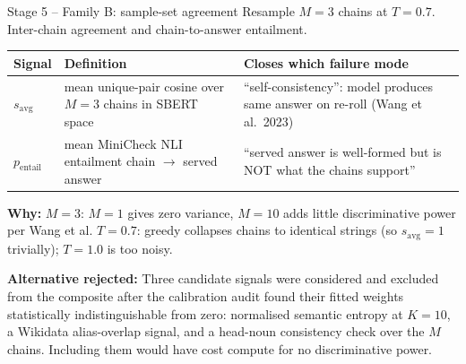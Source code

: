 \documentclass[10pt,aspectratio=169]{beamer}
\newcommand{\why}[1]{{\color{caemamber}\textbf{Why:}} #1}
\newcommand{\altn}[1]{{\color{caemred}\textbf{Alternative rejected:}} #1}
\begin{document}
\begin{frame}{Stage 5 -- Family B: sample-set agreement}
  \scriptsize
  Resample $M{=}3$ chains at $T{=}0.7$. Inter-chain agreement and chain-to-answer entailment.

  \vspace{0.3em}
  \begin{tabular}{@{}lp{4.7cm}p{5cm}@{}}
    \toprule
    Signal & Definition & Closes which failure mode \\
    \midrule
    $s_{\text{avg}}$ & mean unique-pair cosine over $M=3$ chains in SBERT space & ``self-consistency'': model produces same answer on re-roll (Wang et al.\ 2023) \\
    $p_{\text{entail}}$ & mean MiniCheck NLI entailment chain $\to$ served answer & ``served answer is well-formed but is NOT what the chains support'' \\
    \bottomrule
  \end{tabular}

  \vspace{0.4em}
  \why{$M=3$: $M=1$ gives zero variance, $M=10$ adds little discriminative power per Wang et al. $T=0.7$: greedy collapses chains to identical strings (so $s_{\text{avg}}=1$ trivially); $T=1.0$ is too noisy.}

  \altn{Three candidate signals were considered and excluded from the composite after the calibration audit found their fitted weights statistically indistinguishable from zero: normalised semantic entropy at $K{=}10$, a Wikidata alias-overlap signal, and a head-noun consistency check over the $M$ chains. Including them would have cost compute for no discriminative power.}
\end{frame}
\end{document}
